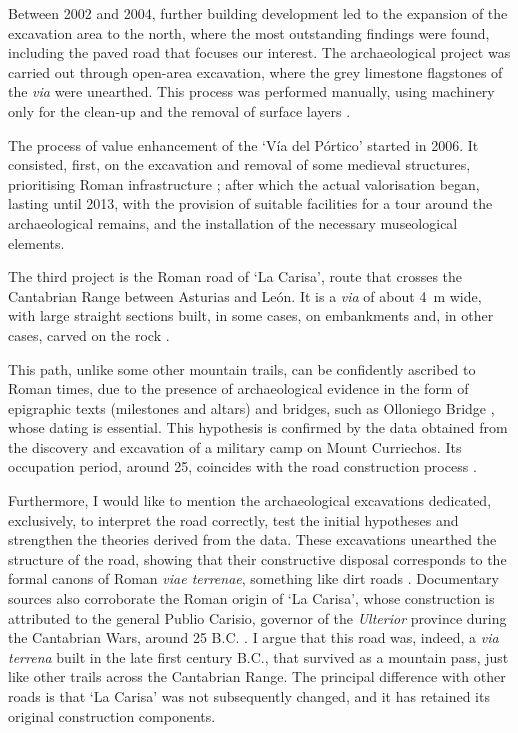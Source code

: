 Between 2002 and 2004, further building development led to the expansion of the excavation area to the north, where the most outstanding findings were found, including the paved road that focuses our interest. The archaeological project was carried out through open-area excavation, where the grey limestone flagstones of the \textit{via} were unearthed. This process was performed manually, using machinery only for the clean-up and the removal of surface layers \parencite[323]{Melchor_2005b}. 

The process of value enhancement of the ‘Vía del Pórtico’ started in 2006. It consisted, first, on the excavation and removal of some medieval structures, prioritising Roman infrastructure \parencite[326]{Melchor_2005b}; after which the actual valorisation began, lasting until 2013, with the provision of suitable facilities for a tour around the archaeological remains, and the installation of the necessary museological elements.


The third project is the Roman road of ‘La Carisa’, route that crosses the Cantabrian Range between Asturias and León. It is a \textit{via} of about \SI{4}{\meter} wide, with large straight sections built, in some cases, on embankments and, in other cases, carved on the rock \parencites[383]{Camino_2010}[181]{González_2011}. 

This path, unlike some other mountain trails, can be confidently ascribed to Roman times, due to the presence of archaeological evidence in the form of epigraphic texts (milestones and altars) and bridges, such as Olloniego Bridge \parencite[179--180]{González_2011}, whose dating is essential. This hypothesis is confirmed by the data obtained from the discovery and excavation of a military camp on Mount Curriechos. Its occupation period, around 25\BC, coincides with the road construction process \parencites[376--377]{Camino_2010}[180]{González_2011}.

Furthermore, I would like to mention the archaeological excavations dedicated, exclusively, to interpret the road correctly, test the initial hypotheses and strengthen the theories derived from the data. These excavations unearthed the structure of the road, showing that their constructive disposal corresponds to the formal canons of Roman \textit{viae terrenae}, something like dirt roads \parencite[180]{González_2011}. Documentary sources also corroborate the Roman origin of ‘La Carisa’, whose construction is attributed to the general Publio Carisio, governor of the \textit{Ulterior} province during the Cantabrian Wars, around 25 B.C. \parencite[377]{Camino_2010}. I argue that this road was, indeed, a \textit{via terrena} built in the late first century B.C., that survived as a mountain pass, just like other trails across the Cantabrian Range. The principal difference with other roads is that ‘La Carisa’ was not subsequently changed, and it has retained its original construction components.

